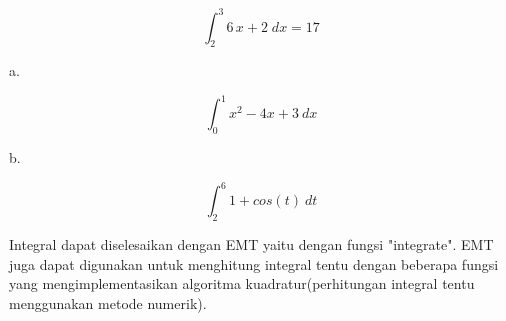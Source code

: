 \documentclass[a4paper,10pt]{article}
\begin{document}
\begin{eulernotebook}
\begin{eulercomment}
\begin{eulercomment}
\begin{eulercomment}
\begin{eulercomment}
\begin{eulercomment}
\begin{eulercomment}
\begin{eulercomment}
\begin{eulercomment}
\begin{eulercomment}
\begin{eulercomment}
\begin{eulercomment}
\begin{eulercomment}
\begin{eulercomment}
\begin{eulercomment}
\begin{eulercomment}
\begin{eulercomment}
\begin{eulercomment}
\begin{eulercomment}
\begin{eulercomment}
\begin{eulercomment}
\begin{eulercomment}
\begin{eulercomment}
\begin{eulercomment}
\begin{eulercomment}
\begin{eulercomment}
\begin{eulercomment}
\begin{eulercomment}
\begin{eulercomment}
\begin{eulercomment}
\begin{eulercomment}
\begin{eulercomment}
\begin{eulercomment}
\begin{eulercomment}
\begin{eulercomment}
\begin{eulercomment}
\begin{eulercomment}
\begin{eulercomment}
\begin{eulercomment}
\begin{eulercomment}
\begin{eulercomment}
\begin{eulercomment}
\begin{eulercomment}
\begin{eulercomment}
\begin{eulercomment}
\begin{eulercomment}
\begin{eulercomment}
\begin{eulercomment}
\begin{eulercomment}
\begin{eulercomment}
\begin{eulercomment}
\begin{eulercomment}
\begin{eulercomment}
\begin{eulercomment}
\begin{eulercomment}
\begin{eulerformula}
\[
\int_{2}^{3}{6\,x+2\;dx}=17
\]
\end{eulerformula}
\begin{eulercomment}
a.\\
\end{eulercomment}
\begin{eulerformula}
\[
\int_0^1 x^2-4x+3\ dx
\]
\end{eulerformula}
\begin{eulercomment}
b.\\
\end{eulercomment}
\begin{eulerformula}
\[
\int_2^6 1+cos(t)\ dt
\]
\end{eulerformula}
\begin{eulercomment}
Integral dapat diselesaikan dengan EMT yaitu dengan fungsi
"integrate". EMT juga dapat digunakan untuk menghitung integral tentu
dengan beberapa fungsi yang mengimplementasikan algoritma
kuadratur(perhitungan integral tentu menggunakan metode numerik).


\end{eulercomment}
\end{eulercomment}
\end{eulercomment}
\end{eulercomment}
\end{eulercomment}
\end{eulercomment}
\end{eulercomment}
\end{eulercomment}
\end{eulercomment}
\end{eulercomment}
\end{eulercomment}
\end{eulercomment}
\end{eulercomment}
\end{eulercomment}
\end{eulercomment}
\end{eulercomment}
\end{eulercomment}
\end{eulercomment}
\end{eulercomment}
\end{eulercomment}
\end{eulercomment}
\end{eulercomment}
\end{eulercomment}
\end{eulercomment}
\end{eulercomment}
\end{eulercomment}
\end{eulercomment}
\end{eulercomment}
\end{eulercomment}
\end{eulercomment}
\end{eulercomment}
\end{eulercomment}
\end{eulercomment}
\end{eulercomment}
\end{eulercomment}
\end{eulercomment}
\end{eulercomment}
\end{eulercomment}
\end{eulercomment}
\end{eulercomment}
\end{eulercomment}
\end{eulercomment}
\end{eulercomment}
\end{eulercomment}
\end{eulercomment}
\end{eulercomment}
\end{eulercomment}
\end{eulercomment}
\end{eulercomment}
\end{eulercomment}
\end{eulercomment}
\end{eulercomment}
\end{eulercomment}
\end{eulercomment}
\end{eulercomment}
\end{eulernotebook}
\end{document}
